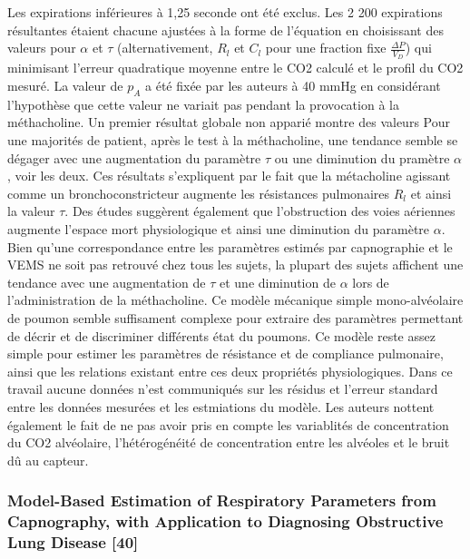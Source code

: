 \documentclass[12pt,]{article}
\begin{document}
Les expirations inférieures à 1,25 seconde ont été exclus. Les 2 200
expirations résultantes étaient chacune ajustées à la forme de
l'équation en choisissant des valeurs pour \(\alpha\) et \(\tau\)
(alternativement, \(R_{l}\) et \(C_{l}\) pour une fraction fixe
\(\frac{\Delta P}{V_{D}}\)) qui minimisant l'erreur quadratique moyenne
entre le CO2 calculé et le profil du CO2 mesuré. La valeur de \(p_{A}\)
a été fixée par les auteurs à 40 mmHg en considérant l'hypothèse que
cette valeur ne variait pas pendant la provocation à la méthacholine. Un
premier résultat globale non apparié montre des valeurs Pour une
majorités de patient, après le test à la méthacholine, une tendance
semble se dégager avec une augmentation du paramètre \(\tau\) ou une
diminution du pramètre \(\alpha\), voir les deux. Ces résultats
s'expliquent par le fait que la métacholine agissant comme un
bronchoconstricteur augmente les résistances pulmonaires \(R_{l}\) et
ainsi la valeur \(\tau\). Des études suggèrent également que
l'obstruction des voies aériennes augmente l'espace mort physiologique
et ainsi une diminution du paramètre \(\alpha\). Bien qu'une
correspondance entre les paramètres estimés par capnographie et le VEMS
ne soit pas retrouvé chez tous les sujets, la plupart des sujets
affichent une tendance avec une augmentation de \(\tau\) et une
diminution de \(\alpha\) lors de l'administration de la méthacholine. Ce
modèle mécanique simple mono-alvéolaire de poumon semble suffisament
complexe pour extraire des paramètres permettant de décrir et de
discriminer différents état du poumons. Ce modèle reste assez simple
pour estimer les paramètres de résistance et de compliance pulmonaire,
ainsi que les relations existant entre ces deux propriétés
physiologiques. Dans ce travail aucune données n'est communiqués sur les
résidus et l'erreur standard entre les données mesurées et les
estmiations du modèle. Les auteurs nottent également le fait de ne pas
avoir pris en compte les variablités de concentration du CO2 alvéolaire,
l'hétérogénéité de concentration entre les alvéoles et le bruit dû au
capteur.

\subsubsection{Model-Based Estimation of Respiratory Parameters from
Capnography, with Application to Diagnosing Obstructive Lung Disease
{[}40{]}}\label{model-based-estimation-of-respiratory-parameters-from-capnography-with-application-to-diagnosing-obstructive-lung-disease-abid2017model}
\end{document}
